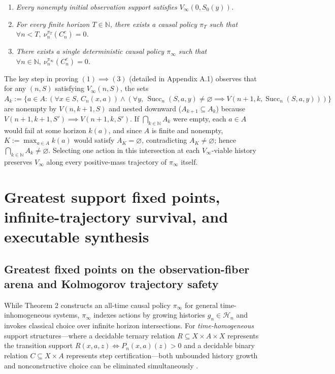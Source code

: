 \documentclass[11pt,a4paper]{article}
\newcounter{none}
\providecommand{\tightlist}{\setlength{\itemsep}{2pt}\setlength{\parskip}{0pt}}
\begin{document}
\begin{enumerate}
\def\labelenumi{\arabic{enumi}.}
\tightlist
\item
  \emph{Every nonempty initial observation support satisfies
  \(V_\infty(0, S_0(y))\).}
\item
  \emph{For every finite horizon \(T \in \mathbb{N}\), there exists a
  causal policy \(\pi_T\) such that
  \(\forall n < T,\ \nu_n^{\pi_T}(C_n^c) = 0\).}
\item
  \emph{There exists a single deterministic causal policy \(\pi_\infty\)
  such that
  \(\forall n \in \mathbb{N},\ \nu_n^{\pi_\infty}(C_n^c) = 0\).}
\end{enumerate}

The key step in proving \((1) \implies (3)\) (detailed in Appendix A.1)
observes that for any \((n, S)\) satisfying \(V_\infty(n, S)\), the sets
\(A_k := \{a \in A : (\forall x \in S,\, C_n(x,a)) \land (\forall y,\, \operatorname{Succ}_n(S,a,y) \neq \varnothing \implies V(n+1, k, \operatorname{Succ}_n(S,a,y)))\}\)
are nonempty by \(V(n, k+1, S)\) and nested downward
(\(A_{k+1} \subseteq A_k\)) because
\(V(n+1, k+1, S') \implies V(n+1, k, S')\). If
\(\bigcap_{k \in \mathbb{N}} A_k\) were empty, each \(a \in A\) would
fail at some horizon \(k(a)\), and since \(A\) is finite and nonempty,
\(K := \max_{a \in A} k(a)\) would satisfy \(A_K = \varnothing\),
contradicting \(A_K \neq \varnothing\); hence
\(\bigcap_{k \in \mathbb{N}} A_k \neq \varnothing\). Selecting one
action in this intersection at each \(V_\infty\)-viable history
preserves \(V_\infty\) along every positive-mass trajectory of
\(\pi_\infty\) itself.

\section{Greatest support fixed points, infinite-trajectory survival,
and executable
synthesis}\label{greatest-support-fixed-points-infinite-trajectory-survival-and-executable-synthesis}

\subsection{Greatest fixed points on the observation-fiber arena and
Kolmogorov trajectory
safety}\label{greatest-fixed-points-on-the-observation-fiber-arena-and-kolmogorov-trajectory-safety}

While Theorem 2 constructs an all-time causal policy \(\pi_\infty\) for
general time-inhomogeneous systems, \(\pi_\infty\) indexes actions by
growing histories \(g_n \in \mathcal{H}_n\) and invokes classical choice
over infinite horizon intersections. For \emph{time-homogeneous} support
structures---where a decidable ternary relation
\(R \subseteq X \times A \times X\) represents the transition support
\(R(x,a,z) \iff P_n(x,a)(z) > 0\) and a decidable binary relation
\(C \subseteq X \times A\) represents step certification---both
unbounded history growth and nonconstructive choice can be eliminated
simultaneously
\citep{papadimitriouTsitsiklis1987, chatterjee2016, junges2021}.
\end{document}
